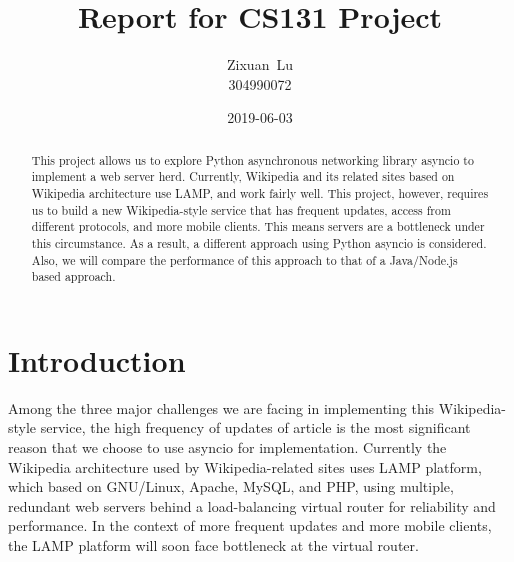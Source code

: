 \documentclass[letterpaper,twocolumn,10pt]{article}
\begin{document}

\date{2019-06-03}

\title{\Large \bf Report for CS131 Project}

\author{
{\rm Zixuan\ Lu}\\
304990072 
} %

\maketitle

\begin{abstract}
This project allows us to explore Python asynchronous networking library asyncio to implement a web server herd. Currently, Wikipedia and its related sites based on Wikipedia architecture use LAMP, and work fairly well. This project, however, requires us to build a new Wikipedia-style service that has frequent updates, access from different protocols, and more mobile clients. This means servers are a bottleneck under this circumstance. As a result, a different approach using Python asyncio is considered. Also, we will compare the performance of this approach to that of a Java/Node.js based approach.
\end{abstract}


\section{Introduction}
Among the three major challenges we are facing in implementing this Wikipedia-style service, the high frequency of updates of article is the most significant reason that we choose to use asyncio for implementation. Currently the Wikipedia architecture used by Wikipedia-related sites uses LAMP platform, which based on GNU/Linux, Apache, MySQL, and PHP, using multiple, redundant web servers behind a load-balancing virtual router for reliability and performance. In the context of more frequent updates and more mobile clients, the LAMP platform will soon face bottleneck at the virtual router. \\
\end{document}
